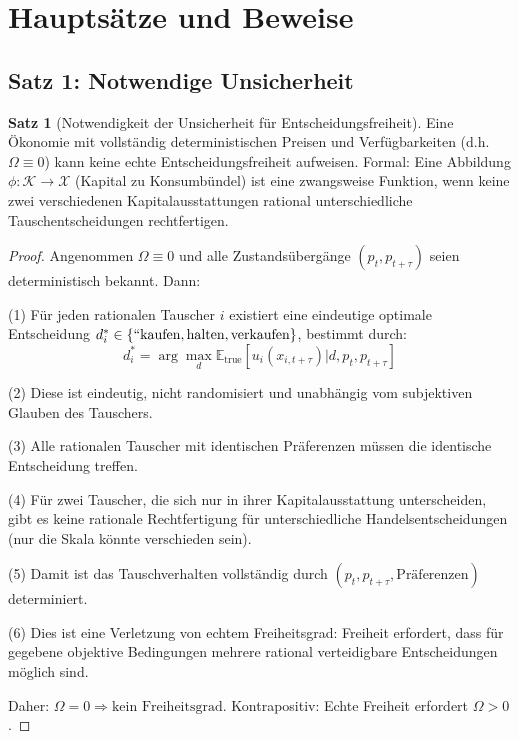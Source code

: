 \documentclass[a4paper,12pt]{article}
\theoremstyle{definition}
\newtheorem{satz}{Satz}
\begin{document}
\section{Hauptsätze und Beweise}

\subsection{Satz 1: Notwendige Unsicherheit}

\begin{satz}[Notwendigkeit der Unsicherheit für Entscheidungsfreiheit]
    \label{satz:notwendige_unsicherheit}
    Eine Ökonomie mit vollständig deterministischen Preisen und Verfügbarkeiten (d.h. $\Omega \equiv 0$) kann keine echte Entscheidungsfreiheit aufweisen. Formal: Eine Abbildung $\phi: \mathcal{K} \to \mathcal{X}$ (Kapital zu Konsumbündel) ist eine zwangsweise Funktion, wenn keine zwei verschiedenen Kapitalausstattungen rational unterschiedliche Tauschentscheidungen rechtfertigen.
\end{satz}

\begin{proof}
    Angenommen $\Omega \equiv 0$ und alle Zustandsübergänge $(p_t, p_{t+\tau})$ seien deterministisch bekannt. Dann:
    
    (1) Für jeden rationalen Tauscher $i$ existiert eine eindeutige optimale Entscheidung $d_i^* \in \{``\text{kaufen}, \text{halten}, \text{verkaufen}\}$, bestimmt durch:
    \begin{equation}
        d_i^* = \arg\max_d \mathbb{E}_{\text{true}}[u_i(x_{i,t+\tau}) | d, p_t, p_{t+\tau}]
    \end{equation}
    
    (2) Diese ist eindeutig, nicht randomisiert und unabhängig vom subjektiven Glauben des Tauschers.
    
    (3) Alle rationalen Tauscher mit identischen Präferenzen müssen die identische Entscheidung treffen.
    
    (4) Für zwei Tauscher, die sich nur in ihrer Kapitalausstattung unterscheiden, gibt es keine rationale Rechtfertigung für unterschiedliche Handelsentscheidungen (nur die Skala könnte verschieden sein).
    
    (5) Damit ist das Tauschverhalten vollständig durch $(p_t, p_{t+\tau}, \text{Präferenzen})$ determiniert.
    
    (6) Dies ist eine Verletzung von echtem Freiheitsgrad: Freiheit erfordert, dass für gegebene objektive Bedingungen mehrere rational verteidigbare Entscheidungen möglich sind.
    
    Daher: $\Omega = 0 \Rightarrow \text{kein Freiheitsgrad}$. Kontrapositiv: Echte Freiheit erfordert $\Omega > 0$.
\end{proof}
\end{document}
